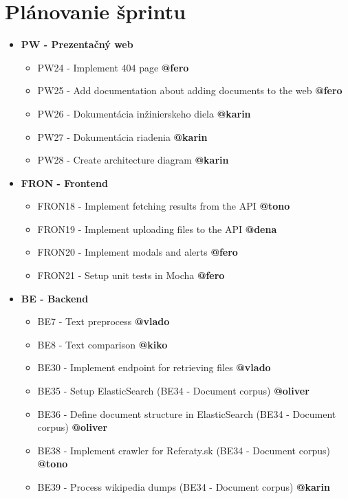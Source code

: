 \documentclass{article}
\begin{document}
    \section*{Plánovanie šprintu}

    \begin{itemize}
    \item \textbf {PW - Prezentačný web} 
        \begin{itemize}
            \item PW24 - Implement 404 page \textbf {@fero}
            \item PW25 - Add documentation about adding documents to the web \textbf {@fero}
            \item PW26 - Dokumentácia inžinierskeho diela \textbf {@karin}
            \item PW27 - Dokumentácia riadenia \textbf {@karin}
            \item PW28 - Create architecture diagram \textbf {@karin}
        \end{itemize}
    \item \textbf {FRON - Frontend} 
        \begin{itemize}
            \item FRON18 - Implement fetching results from the API \textbf {@tono}
            \item FRON19 - Implement uploading files to the API \textbf {@dena}
            \item FRON20 - Implement modals and alerts \textbf {@fero}
            \item FRON21 - Setup unit tests in Mocha \textbf {@fero}
        \end{itemize}  
    \item \textbf {BE - Backend} 
        \begin{itemize}
            \item BE7 - Text preprocess \textbf {@vlado}
            \item BE8 - Text comparison \textbf {@kiko}
            \item BE30 - Implement endpoint for retrieving files \textbf {@vlado}
            \item BE35 - Setup ElasticSearch (BE34 - Document corpus) \textbf {@oliver}
            \item BE36 - Define document structure in ElasticSearch (BE34 - Document corpus) \textbf {@oliver}
            \item BE38 - Implement crawler for Referaty.sk (BE34 - Document corpus) \textbf {@tono}
            \item BE39 - Process wikipedia dumps (BE34 - Document corpus) \textbf {@karin}
        \end{itemize}        
    \end{itemize}
\end{document}
